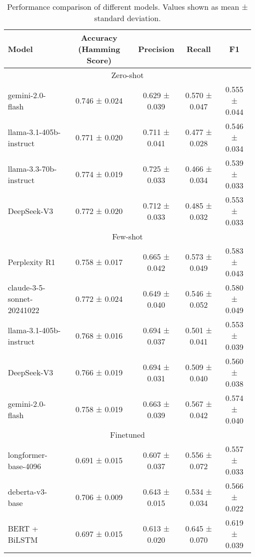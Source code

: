 \begin{table*}[htbp]
\centering
\begin{tabular}{lcccc}
\hline
Model & Accuracy (Hamming Score) & Precision & Recall & F1 \\
\hline
\multicolumn{5}{c}{Zero-shot} \\
\hline
gemini-2.0-flash & 0.746 ± 0.024 & 0.629 ± 0.039 & 0.570 ± 0.047 & 0.555 ± 0.044 \\
llama-3.1-405b-instruct & 0.771 ± 0.020 & 0.711 ± 0.041 & 0.477 ± 0.028 & 0.546 ± 0.034 \\
llama-3.3-70b-instruct & 0.774 ± 0.019 & 0.725 ± 0.033 & 0.466 ± 0.034 & 0.539 ± 0.033 \\
DeepSeek-V3 & 0.772 ± 0.020 & 0.712 ± 0.033 & 0.485 ± 0.032 & 0.553 ± 0.033 \\
\multicolumn{5}{c}{Few-shot} \\
\hline
Perplexity R1 & 0.758 ± 0.017 & 0.665 ± 0.042 & 0.573 ± 0.049 & 0.583 ± 0.043 \\
claude-3-5-sonnet-20241022 & 0.772 ± 0.024 & 0.649 ± 0.040 & 0.546 ± 0.052 & 0.580 ± 0.049 \\
llama-3.1-405b-instruct & 0.768 ± 0.016 & 0.694 ± 0.037 & 0.501 ± 0.041 & 0.553 ± 0.039 \\
DeepSeek-V3 & 0.766 ± 0.019 & 0.694 ± 0.031 & 0.509 ± 0.040 & 0.560 ± 0.038 \\
gemini-2.0-flash & 0.758 ± 0.019 & 0.663 ± 0.039 & 0.567 ± 0.042 & 0.574 ± 0.040 \\
\multicolumn{5}{c}{Finetuned} \\
\hline
longformer-base-4096 & 0.691 ± 0.015 & 0.607 ± 0.037 & 0.556 ± 0.072 & 0.557 ± 0.033 \\
deberta-v3-base & 0.706 ± 0.009 & 0.643 ± 0.015 & 0.534 ± 0.034 & 0.566 ± 0.022 \\
BERT + BiLSTM & 0.697 ± 0.015 & 0.613 ± 0.020 & 0.645 ± 0.070 & 0.619 ± 0.039 \\
\hline
\end{tabular}
\caption{Performance comparison of different models. Values shown as mean ± standard deviation.}
\label{table:prediction-modelling}
\end{table*}